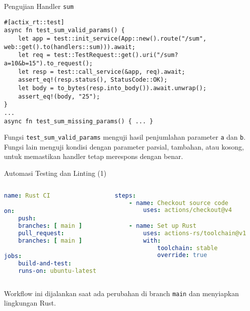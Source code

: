 \documentclass[aspectratio=169, table]{beamer}
\begin{document}
\begin{frame}[fragile]{Pengujian Handler \texttt{sum}}
	\vspace{20pt}
\begin{lstlisting}[style=RustStyle]
#[actix_rt::test]
async fn test_sum_valid_params() {
	let app = test::init_service(App::new().route("/sum", web::get().to(handlers::sum))).await;
	let req = test::TestRequest::get().uri("/sum?a=10&b=15").to_request();
	let resp = test::call_service(&app, req).await;
	assert_eq!(resp.status(), StatusCode::OK);
	let body = to_bytes(resp.into_body()).await.unwrap();
	assert_eq!(body, "25");
}
...
async fn test_sum_missing_params() { ... }
\end{lstlisting}

Fungsi \texttt{test\_sum\_valid\_params} menguji hasil penjumlahan parameter \texttt{a} dan \texttt{b}. Fungsi lain menguji kondisi dengan parameter parsial, tambahan, atau kosong, untuk memastikan handler tetap merespons dengan benar.
\end{frame}



\begin{frame}[fragile]{Automasi Testing dan Linting (1)}
\vspace{10pt}
\begin{columns}[T]
\begin{column}{0.5\textwidth}
\begin{lstlisting}[language=yaml, firstnumber=1]
name: Rust CI

on:
	push:
	branches: [ main ]
	pull_request:
	branches: [ main ]

jobs:
	build-and-test:
	runs-on: ubuntu-latest
\end{lstlisting}
\end{column}

\begin{column}{0.5\textwidth}
\begin{lstlisting}[language=yaml, firstnumber=12]
steps:
	- name: Checkout source code
		uses: actions/checkout@v4

	- name: Set up Rust
		uses: actions-rs/toolchain@v1
		with:
			toolchain: stable
			override: true
\end{lstlisting}
\end{column}
\end{columns}

\vspace{6pt}
Workflow ini dijalankan saat ada perubahan di branch \texttt{main} dan menyiapkan lingkungan Rust.
\end{frame}
\end{document}
